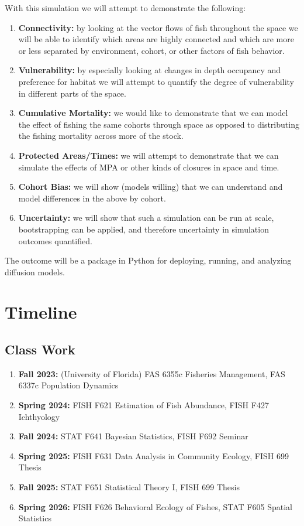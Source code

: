 \documentclass[11pt]{article}
\begin{document}
With this simulation we will attempt to demonstrate the following:

\begin{enumerate}
\item \textbf{Connectivity:} by looking at the vector flows of fish throughout the space we will be able to identify which areas are highly connected and which are more or less separated by environment, cohort, or other factors of fish behavior.
\item \textbf{Vulnerability:} by especially looking at changes in depth occupancy and preference for habitat we will attempt to quantify the degree of vulnerability in different parts of the space. 
\item \textbf{Cumulative Mortality:} we would like to demonstrate that we can model the effect of fishing the same cohorts through space as opposed to distributing the fishing mortality across more of the stock. 
\item \textbf{Protected Areas/Times:} we will attempt to demonstrate that we can simulate the effects of MPA or other kinds of closures in space and time. 
\item \textbf{Cohort Bias:} we will show (models willing) that we can understand and model differences in the above by cohort.
\item \textbf{Uncertainty:} we will show that such a simulation can be run at scale, bootstrapping can be applied, and therefore uncertainty in simulation outcomes quantified. 
\end{enumerate}

The outcome will be a package in Python for deploying, running, and analyzing diffusion models. 





\newpage



\section{Timeline}

\subsection{Class Work}

\begin{enumerate}
\item \textbf{Fall 2023:} (University of Florida) FAS 6355c Fisheries Management, FAS 6337c Population Dynamics
\item \textbf{Spring 2024:} FISH F621 Estimation of Fish Abundance, FISH F427 Ichthyology
\item \textbf{Fall 2024:} STAT F641 Bayesian Statistics, FISH F692 Seminar
\item \textbf{Spring 2025:} FISH F631 Data Analysis in Community Ecology, FISH 699 Thesis 
\item \textbf{Fall 2025:} STAT F651 Statistical Theory I, FISH 699 Thesis
\item \textbf{Spring 2026:} FISH F626  Behavioral Ecology of Fishes, STAT F605 Spatial Statistics 
\end{enumerate}
\end{document}

